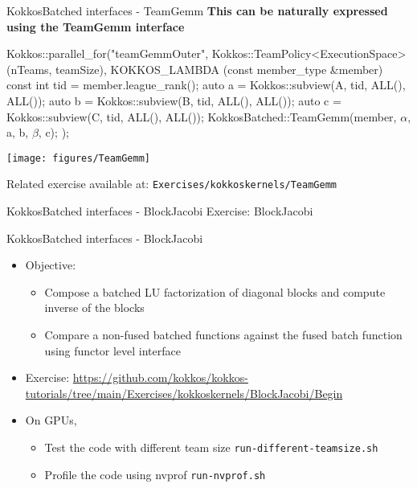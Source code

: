 \begin{frame}[fragile]{KokkosBatched interfaces - TeamGemm}
  \textbf{This can be naturally expressed using the TeamGemm interface} \\
  \begin{code}[keywords={parallel_for,auto,const,int}]
    Kokkos::parallel_for("teamGemmOuter", 
      Kokkos::TeamPolicy<ExecutionSpace>(nTeams, teamSize),
      KOKKOS_LAMBDA (const member_type &member) {
        const int tid = member.league_rank();
        auto a = Kokkos::subview(A, tid, ALL(), ALL());
        auto b = Kokkos::subview(B, tid, ALL(), ALL());
        auto c = Kokkos::subview(C, tid, ALL(), ALL());
        KokkosBatched::TeamGemm(member, $\alpha$, a, b, $\beta$, c);
    });
  \end{code}
  \begin{center}
    \texttt{[image: figures/TeamGemm]}
  \end{center}
  \vspace{-1em}
  \scriptsize{Related exercise available at: \verb!Exercises/kokkoskernels/TeamGemm!}
\end{frame}
\begin{frame}[fragile]{KokkosBatched interfaces - BlockJacobi}
  \Huge {Exercise: BlockJacobi}
\end{frame}

\begin{frame}[fragile]{KokkosBatched interfaces - BlockJacobi}

  \begin{itemize}
  \item Objective:
    \begin{itemize}
    \item \small{Compose a batched LU factorization of diagonal blocks and compute inverse of the blocks}
    \item \small{Compare a non-fused batched functions against the fused batch function using functor level interface} 
    \end{itemize}
  \item Exercise: \url{https://github.com/kokkos/kokkos-tutorials/tree/main/Exercises/kokkoskernels/BlockJacobi/Begin}
  \item On GPUs,
    \begin{itemize}
    \item Test the code with different team size \verb|run-different-teamsize.sh|
    \item Profile the code using nvprof \verb|run-nvprof.sh|
    \end{itemize}
  \end{itemize}

\end{frame}

